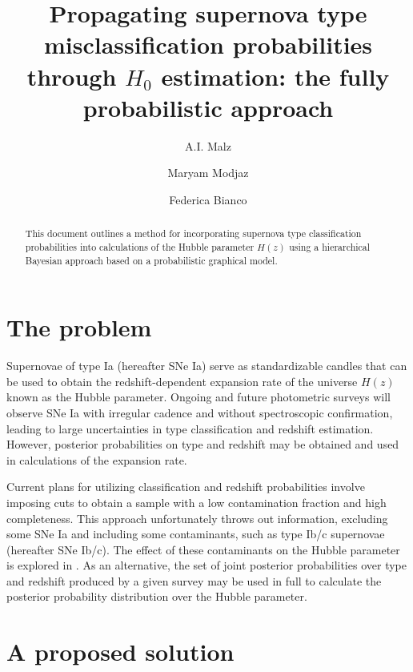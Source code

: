 \documentclass[12pt, onecolumn]{emulateapj}
\begin{document}
\title{Propagating supernova type misclassification probabilities through $H_{0}$ estimation: the fully probabilistic approach}

\author{A.I. Malz}
\author{Maryam Modjaz}
\author{Federica Bianco}

\begin{abstract}
This document outlines a method for incorporating supernova type classification probabilities into calculations of the Hubble parameter $H(z)$ using a hierarchical Bayesian approach based on a probabilistic graphical model.
\end{abstract}

\keywords{}

\section{The problem}
\label{sec:intro}

Supernovae of type Ia (hereafter SNe Ia) serve as standardizable candles that can be used to obtain the redshift-dependent expansion rate of the universe $H(z)$ known as the Hubble parameter.  Ongoing and future photometric surveys will observe SNe Ia with irregular cadence and without spectroscopic confirmation, leading to large uncertainties in type classification and redshift estimation.  However, posterior probabilities on type and redshift may be obtained and used in calculations of the expansion rate.  

Current plans for utilizing classification and redshift probabilities involve imposing cuts to obtain a sample with a low contamination fraction and high completeness.  This approach unfortunately throws out information, excluding some SNe Ia and including some contaminants, such as type Ib/c supernovae (hereafter SNe Ib/c).   The effect of these contaminants on the Hubble parameter is explored in \citet{Homeier05}.  As an alternative, the set of joint posterior probabilities over type and redshift produced by a given survey may be used in full to calculate the posterior probability distribution over the Hubble parameter.  

\section{A proposed solution}
\label{sec:confrac}
\end{document}
